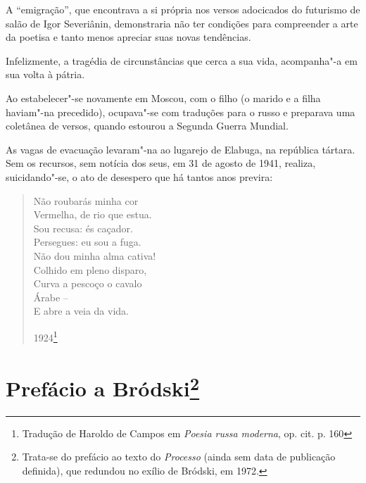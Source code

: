 A ``emigração'', que encontrava a si própria nos versos adocicados do
futurismo de salão de Igor Severiânin, demonstraria não ter condições
para compreender a arte da poetisa e tanto menos apreciar suas novas
tendências.

Infelizmente, a tragédia de circunstâncias que cerca a sua vida,
acompanha"-a em sua volta à pátria.

Ao estabelecer"-se novamente em Moscou, com o filho (o marido e a filha
haviam"-na precedido), ocupava"-se com traduções para o russo e preparava
uma coletânea de versos, quando estourou a Segunda Guerra Mundial.

As vagas de evacuação levaram"-na ao lugarejo de Elabuga, na república
tártara. Sem os recursos, sem notícia dos seus, em 31 de agosto de 1941,
realiza, suicidando"-se, o ato de desespero que há tantos anos previra:

\begin{verse}
Não roubarás minha cor \\
Vermelha, de rio que estua. \\
Sou recusa: és caçador. \\
Persegues: eu sou a fuga. \\[8pt]
Não dou minha alma cativa! \\
Colhido em pleno disparo, \\
Curva a pescoço o cavalo \\
Árabe -- \\
E abre a veia da vida. \\
\begin{flushright}
1924\footnote{Tradução de Haroldo de Campos em \emph{Poesia russa
  moderna}, op. cit. p. 160}
  \end{flushright}
\end{verse}


\chapter{Prefácio a Bródski\footnote{Trata-se do prefácio ao texto do
  \emph{Processo} (ainda sem data de publicação definida), que redundou
  no exílio de Bródski, em 1972.}}

